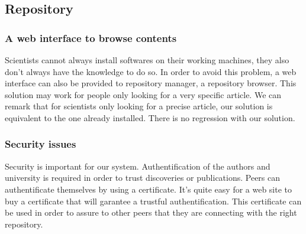 \subsection{Repository}

\subsubsection{A web interface to browse contents}

Scientists cannot always install softwares on their working machines, they also
don't always have the knowledge to do so. In order to avoid this problem, a web interface
can also be provided to repository manager, a repository browser. This solution may work
for people only looking for a very specific article. We can remark that for scientists only
looking for a precise article, our solution is equivalent to the one already installed. There is
no regression with our solution.

\subsubsection{Security issues}

Security is important for our system. Authentification of the authors and
university is required in order to trust discoveries or publications. Peers
can authentificate themselves by using a certificate. It's quite easy for 
a web site to buy a certificate that will garantee a trustful authentification.
This certificate can be used in order to assure to other peers that they are connecting
with the right repository.
